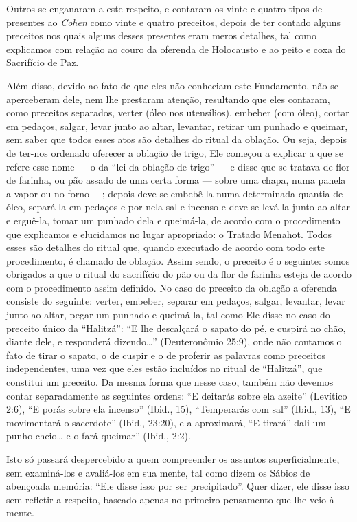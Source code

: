 Outros se enganaram a este respeito, e contaram os vinte e quatro tipos
de presentes ao \textit{Cohen} como vinte e quatro preceitos, depois de ter
contado alguns preceitos nos quais alguns desses presentes eram meros
detalhes, tal como explicamos com relação ao couro da oferenda de
Holocausto e ao peito e coxa do Sacrifício de Paz.

Além disso, devido ao fato de que eles não conheciam este Fundamento,
não se aperceberam dele, nem lhe prestaram atenção, resultando que eles
contaram, como preceitos separados, verter (óleo nos utensílios),
embeber (com óleo), cortar em pedaços, salgar, levar junto ao altar,
levantar, retirar um punhado e queimar, sem saber que todos esses atos
são detalhes do ritual da oblação. Ou seja, depois de ter-nos ordenado
oferecer a oblação de trigo, Ele começou a explicar a que se refere esse
nome --- o da ``lei da oblação de trigo'' --- e disse que se tratava de
flor de farinha, ou pão assado de uma certa forma --- sobre uma chapa,
numa panela a vapor ou no forno ---; depois deve-se embebê-la numa
determinada quantia de óleo, separá-la em pedaços e por nela sal e
incenso e deve-se levá-la junto ao altar e erguê-la, tomar um punhado
dela e queimá-la, de acordo com o procedimento que explicamos e
elucidamos no lugar apropriado: o Tratado Menahot. Todos esses são
detalhes do ritual que, quando executado de acordo com todo este
procedimento, é chamado de oblação. Assim sendo, o preceito é o
seguinte: somos obrigados a que o ritual do sacrifício do pão ou da flor
de farinha esteja de acordo com o procedimento assim definido. No caso
do preceito da oblação a oferenda consiste do seguinte: verter,
embeber, separar em pedaços, salgar, levantar, levar junto ao altar,
pegar um punhado e queimá-la, tal como Ele disse no caso do preceito
único da ``Halitzá'': ``E lhe descalçará o sapato do pé, e cuspirá no
chão, diante dele, e responderá dizendo\ldots{}'' (Deuteronômio 25:9), onde
não contamos o fato de tirar o sapato, o de cuspir e o de proferir as
palavras como preceitos independentes, uma vez que eles estão incluídos
no ritual de ``Halitzá'', que constitui um preceito. Da mesma forma que
nesse caso, também não devemos contar separadamente as seguintes ordens:
``E deitarás sobre ela azeite'' (Levítico 2:6), ``E porás sobre ela
incenso'' (Ibid., 15), ``Temperarás com sal'' (Ibid., 13), ``E
movimentará o sacerdote'' (Ibid., 23:20), e a aproximará, ``E tirará''
dali um punho cheio\ldots{} e o fará queimar'' (Ibid., 2:2).

Isto só passará despercebido a quem compreender os assuntos
superficialmente, sem examiná-los e avaliá-los em sua mente, tal como
dizem os Sábios de abençoada memória: ``Ele disse isso por ser
precipitado''. Quer dizer, ele disse isso sem refletir a respeito,
baseado apenas no primeiro pensamento que lhe veio à mente.

